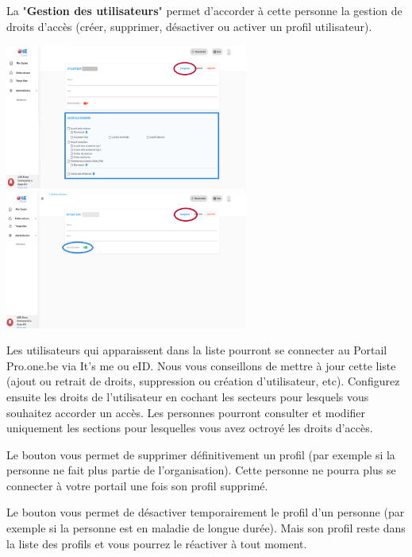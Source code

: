 La "\textbf{Gestion des utilisateurs}" permet d’accorder à cette personne la gestion de droits d'accès (créer, supprimer, désactiver ou activer un profil utilisateur).


\vspace{2mm}
\centerline{\includegraphics[width=8cm]{Images/intro/config_user.png}\hspace{1cm}  \includegraphics[width=8cm]{Images/intro/config_admin.png}}

\vspace{2mm}

Les utilisateurs qui apparaissent dans la liste pourront se connecter au Portail Pro.one.be via It's me ou eID. Nous vous conseillons de mettre à jour cette liste (ajout ou retrait de droits, suppression ou création d'utilisateur, etc). Configurez ensuite les droits de l'utilisateur en cochant les secteurs pour lesquels vous souhaitez accorder un accès. Les personnes pourront consulter et modifier uniquement les sections pour lesquelles vous avez octroyé les droits d'accès. 

Le bouton  vous permet de supprimer définitivement un profil (par exemple si la personne ne fait plus partie de l'organisation). Cette personne ne pourra plus se connecter à votre portail une fois son profil supprimé.

Le bouton  vous permet de désactiver temporairement le profil d’un personne (par exemple si la personne est en maladie de longue durée). Mais son profil reste dans la liste des profils et vous pourrez le réactiver à tout moment.


